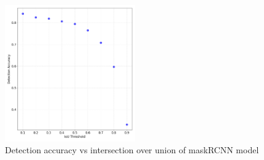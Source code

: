 \documentclass[final]{cmpreport_02}
\begin{document}
\begin{figure}[h!]
	\centering
	\includegraphics[width=0.5\textwidth]{./images/AEIOUThresholdDetect.png}
	\caption{Detection accuracy vs intersection over union of maskRCNN model}
	\label{AE:IOUThresholdDetect}
\end{figure}
\end{document}
